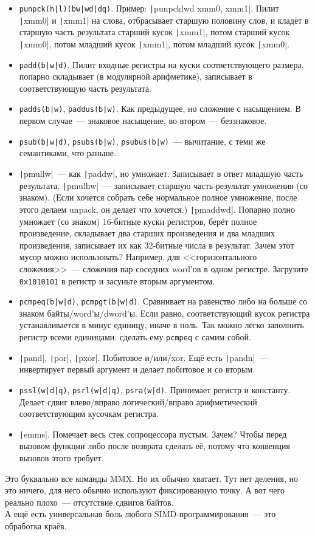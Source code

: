 \documentclass{article}
\begin{document}
\begin{itemize}
        \item \Verb/punpck(h|l)(bw|wd|dq)/. Пример: \texttt|punpcklwd xmm0, xmm1|. Пилит \texttt|xmm0| и \texttt|xmm1| на слова, отбрасывает старшую половину слов, и кладёт в старшую часть результата старший кусок \texttt|xmm1|, потом старший кусок \texttt|xmm0|, потом младший кусок \texttt|xmm1|, потом младший кусок \texttt|xmm0|.
        \item \Verb/padd(b|w|d)/. Пилит входные регистры на куски соответствующего размера, попарно складывает (в модулярной арифметике), записывает в соответствующую часть результата.
        \item \Verb/padds(b|w)/, \Verb/paddus(b|w)/. Как предыдущее, но сложение с насыщением. В первом случае~--- знаковое насыщение, во втором~--- беззнаковое.
        \item \Verb/psub(b|w|d)/, \Verb/psubs(b|w)/, \Verb/psubus(b|w)/~--- вычитание, с теми же семантиками, что раньше.
        \item \texttt|pmullw|~--- как \texttt|paddw|, но умножает. Записывает в ответ младшую часть результата. \texttt|pmulhw|~--- записывает старшую часть результат умножения (со знаком). (Если хочется собрать себе нормальное полное умножение, после этого делаем unpack, он делает что хочется.) \texttt|pmaddwd|. Попарно полно умножает (со знаком) 16-битные куски регистров, берёт полное произведение, складывает два старших произведения и два младших произведения, записывает их как 32-битные числа в результат. Зачем этот мусор можно использовать? Например, для <<горизонтального сложения>>~--- сложения пар соседних word'ов в одном регистре. Загрузите \Verb|0x1010101| в регистр и засуньте вторым аргументом.
        \item \Verb/pcmpeq(b|w|d)/, \Verb/pcmpgt(b|w|d)/. Сравнивает на равенство либо на больше со знаком байты/word'ы/dword'ы. Если равно, соответствующий кусок регистра устанавливается в минус единицу, иначе в ноль. Так можно легко заполнить регистр всеми единицами: сделать ему \Verb|pcmpeq| с самим собой.
        \item \texttt|pand|, \texttt|por|, \texttt|pxor|. Побитовое и/или/xor. Ещё есть \texttt|pandn|~--- инвертирует первый аргумент и делает побитовое и со вторым.
        \item \Verb/pssl(w|d|q)/, \Verb/psrl(w|d|q)/, \Verb/psra(w|d)/. Принимает регистр и константу. Делает сдвиг влево/вправо логический/вправо арифметический соответствующим кусочкам регистра.
        \item \texttt|emms|. Помечает весь стек сопроцессора пустым. Зачем? Чтобы перед вызовом функции либо после возврата сделать её, потому что конвенция вызовов этого требует.
    \end{itemize}
    Это буквально все команды MMX. Но их обычно хватает. Тут нет деления, но это ничего, для него обычно используют фиксированную точку. А вот чего реально плохо~--- отсутствие сдвигов байтов.\\
    А ещё есть универсальная боль любого SIMD-программирования~--- это обработка краёв.
\end{document}
